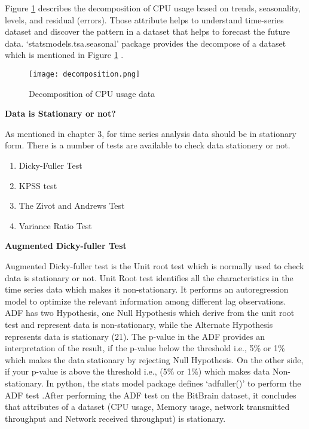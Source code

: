 

Figure \ref{fig:decompos} describes the decomposition of CPU usage based on trends, seasonality, levels, and residual (errors). Those attribute helps to understand time-series dataset and discover the pattern in a dataset that helps to forecast the future data. ‘statsmodels.tsa.seasonal’ package provides the decompose of a dataset which is mentioned in Figure \ref{fig:decompos} .
\begin{figure}
  \centering
    
      \texttt{[image: decomposition.png]}
  \caption{Decomposition of CPU usage data}
  \label{fig:decompos}
\end{figure}

\textbf{Data is Stationary or not?}

As mentioned in chapter 3, for time series analysis data should be in stationary form.
There is a number of tests are available to check data stationery or not.
\begin{enumerate}
\item Dicky-Fuller Test
\item KPSS test
\item The Zivot and Andrews Test 
\item Variance Ratio Test
\end{enumerate}

\textbf{Augmented Dicky-fuller Test}

Augmented Dicky-fuller test is the Unit root test which is normally used to check data is stationary or not. Unit Root test identifies all the characteristics in the time series data which makes it non-stationary. It performs an autoregression model to optimize the relevant information among different lag observations. ADF has two Hypothesis, one Null Hypothesis which derive from the unit root test and represent data is non-stationary, while the Alternate Hypothesis represents data is stationary (21).
The p-value in the ADF provides an interpretation of the result, if the p-value below the threshold i.e., 5\% or 1\% which makes the data stationary by rejecting Null Hypothesis. On the other side,  if your p-value is above the threshold i.e., (5\% or 1\%) which makes data Non-stationary. In python, the stats model package defines ‘adfuller()’ to perform the ADF test \cite{cheung1995lag}.After performing the ADF test on the BitBrain dataset, it concludes that attributes of a dataset (CPU usage, Memory usage, network transmitted throughput and Network received throughput) is stationary.

